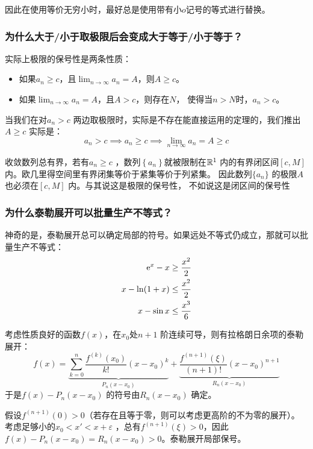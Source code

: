因此在使用等价无穷小时，最好总是使用带有小\(o\)记号的等式进行替换。

\subsubsection{为什么大于/小于取极限后会变成大于等于/小于等于？}
实际上极限的保号性是两条性质：
\begin{itemize}
    \item 如果\(a_{n} \geq c\)，且\(\lim_{n \to \infty} a_{n} = A\)，则\(A \geq c\)。
    \item 如果\(\lim_{n \to \infty} a_{n} = A\)，且\(A > c  \)，则存在\(N\)，
        使得当\(n > N\)时，\(a_{n} > c\)。
\end{itemize}
当我们在对\(a_{n}>c \) 两边取极限时，实际是不存在能直接运用的定理的，我们推出\(A\geq c \) 实际是：\[
    a_{n} > c \implies a_{n}\geq c \implies \lim_{n \to \infty} a_{n} = A \geq c
\]

收敛数列总有界，若有\(a_{n} \geq c\) ，数列\(\left\{ a_{n}
\right\}\)就被限制在\(\mathbb{R}^{1} \) 内的有界闭区间\([c,M]\)内。欧几里得空间里有界闭集等价于紧集等价于列紧集。
因此数列\(\{a_{n}\}\) 的极限\(A\) 也必须在\([c,M]\) 内。与其说这是极限的保号性，
不如说这是闭区间的保号性

\subsubsection{为什么泰勒展开可以批量生产不等式？}

神奇的是，泰勒展开总可以确定局部的符号。如果远处不等式仍成立，那就可以批量生产不等式：
\begin{align*}
    \mathrm{e}^{x} - x &\geq \frac{x^{2}}{2} \\
    x- \ln (1+x) &\leq \frac{x^2}{2} \\
    x - \sin x &\leq \frac{x^3}{6}
\end{align*}

考虑性质良好的函数\(f(x)\)，在\(x_{0}\)处\(n+1\) 阶连续可导，则有拉格朗日余项的泰勒展开：
\[
    f(x) = \underbrace{\sum_{k=0}^{n} \frac{f^{(k)}(x_{0})}{k!}
    (x-x_{0})^{k}}_{P_{n}(x-x_{0})}
    + \underbrace{\frac{f^{(n+1)}(\xi)}{(n+1)!}
    (x-x_{0})^{n+1}}_{R_{n}(x-x_{0})}
\]
于是\(f(x) - P_{n}(x-x_{0})\) 的符号由\(R_{n}(x-x_{0})\) 确定。

假设\(f^{(n+1)}(0)>0 \)（若存在且等于零，则可以考虑更高阶的不为零的展开）。
考虑足够小的\(x_{0}<x'<x+\varepsilon\) ，总有\(f^{(n+1)}(\xi) > 0\)，因此\(f(x) -
P_{n}(x-x_{0}) = R_{n}(x-x_{0}) > 0\)。泰勒展开局部保号。

